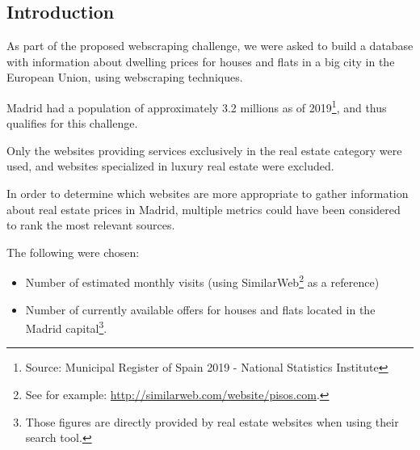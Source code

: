 \documentclass{article}
\newcommand{\ezskip}{\medskip\noindent}
\begin{document}
    \begin{normalsize}
    
    	\section{Introduction}

        As part of the proposed webscraping challenge, we were asked to build a database with information about dwelling  prices for houses and flats in a big city in the European Union, using webscraping techniques.

        \ezskip Madrid had a population of approximately 3.2 millions as of 2019\footnote{Source: Municipal Register of Spain 2019 - National Statistics Institute}, and thus qualifies for this challenge.

    	\ezskip
    	Only the websites providing services exclusively in the real estate category were used, and websites specialized in luxury real estate were excluded.
    	
    	\ezskip
    	In order to determine which websites are more appropriate to gather information about real estate prices in Madrid, multiple metrics could have been considered to rank the most relevant sources. 

    	\ezskip The following were chosen:
    
    	\begin{itemize}
    	    \item Number of estimated monthly visits (using SimilarWeb\footnote{See for example: \url{http://similarweb.com/website/pisos.com}.} as a reference)
            \item Number of currently available offers for houses and flats located in the Madrid capital\footnote{Those figures are directly provided by real estate websites when using their search tool.}.
    	\end{itemize}


\end{normalsize}
\end{document}
